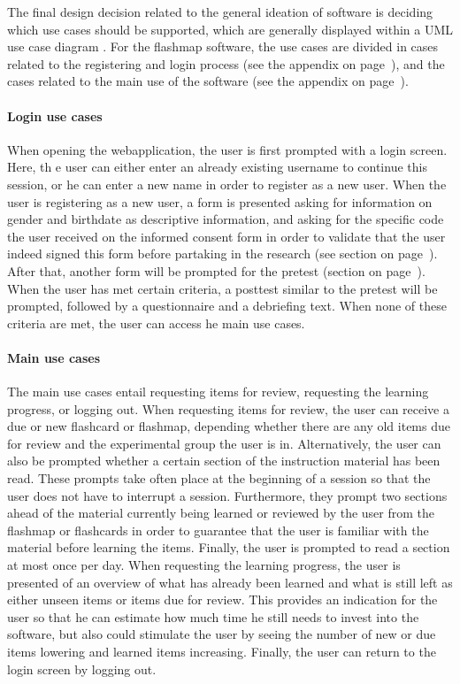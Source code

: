 The final design decision related to the general ideation of software is deciding which use cases should be supported, which are generally displayed within a UML use case diagram \cite{uml}. For the flashmap software, the use cases are divided in cases related to the registering and login process (see the  appendix on page~\pageref{app:loginusecase}), and the cases related to the main use of the software (see the  appendix on page~\pageref{app:mainusecase}).

\paragraph{Login use cases} When opening the webapplication, the user is first prompted with a login screen. Here, th e user can either enter an already existing username to continue this session, or he can enter a new name in order to register as a new user. When the user is registering as a new user, a form is presented asking for information on gender and birthdate as descriptive information, and asking for the specific code the user received on the informed consent form in order to validate that the user indeed signed this form before partaking in the research (see section  on page~\pageref{sec:procedure}). After that, another form will be prompted for the pretest (section  on page~\pageref{sec:instrumentation}). When the user has met certain criteria, a posttest similar to the pretest will be prompted, followed by a questionnaire and a debriefing text. When none of these criteria are met, the user can access he main use cases.

\paragraph{Main use cases} The main use cases entail requesting items for review, requesting the learning progress, or logging out. When requesting items for review, the user can receive a due or new flashcard or flashmap, depending whether there are any old items due for review and the experimental group the user is in. Alternatively, the user can also be prompted whether a certain section of the instruction material has been read. These prompts take often place at the beginning of a session so that the user does not have to interrupt a session. Furthermore, they prompt two sections ahead of the material currently being learned or reviewed by the user from the flashmap or flashcards in order to guarantee that the user is familiar with the material before learning the items. Finally, the user is prompted to read a section at most once per day. When requesting the learning progress, the user is presented of an overview of what has already been learned and what is still left as either unseen items or items due for review. This provides an indication for the user so that he can estimate how much time he still needs to invest into the software, but also could stimulate the user by seeing the number of new or due items lowering and learned items increasing. Finally, the user can return to the login screen by logging out.


